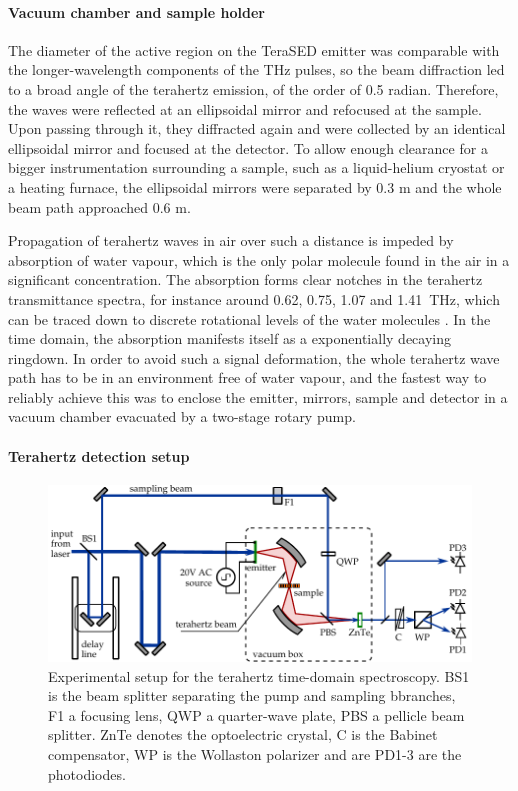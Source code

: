 \paragraph{Vacuum chamber and sample holder}%
The diameter of the active region on the TeraSED emitter was comparable with the longer-wavelength components of the THz pulses, so the beam diffraction led to a broad angle of the terahertz emission, of the order of 0.5 radian. Therefore, the waves were reflected at an ellipsoidal %
 mirror and refocused at the sample. Upon passing through it, they diffracted again and were collected by an identical ellipsoidal mirror and focused at the detector. 
To allow enough clearance for a bigger instrumentation surrounding a sample, such as a liquid-helium cryostat or a heating furnace, the ellipsoidal mirrors were separated by 0.3 m and the whole beam path approached 0.6 m. %

Propagation of terahertz waves in air over such a distance is impeded by absorption of water vapour, which is the only polar molecule found in the air in a significant concentration. The absorption forms clear notches in the terahertz transmittance spectra, for instance around 0.62, 0.75, 1.07 and 1.41~THz, which can be traced down to discrete rotational levels of the water molecules \cite{exter1989}. In the time domain, the absorption manifests itself as a exponentially decaying ringdown. %
In order to avoid such a signal deformation,
the whole terahertz wave path has to be in an environment free of water vapour, and the fastest way to reliably achieve this was to enclose the emitter, mirrors, sample and detector in a vacuum chamber evacuated by a two-stage rotary pump. 

\paragraph{Terahertz detection setup}%
\begin{figure}[ht] \caption{Experimental setup for the terahertz time-domain spectroscopy. BS1 is the beam splitter separating the pump and sampling bbranches, F1 a focusing lens, QWP a quarter-wave plate, PBS a pellicle beam splitter.  ZnTe denotes the optoelectric crystal, C is the Babinet compensator, WP is the Wollaston polarizer and are PD1-3 are the photodiodes.} \label{fg_exp} \centering 
	\includegraphics[width=\textwidth]{img/exp_THz_sampling.pdf}
\end{figure}

